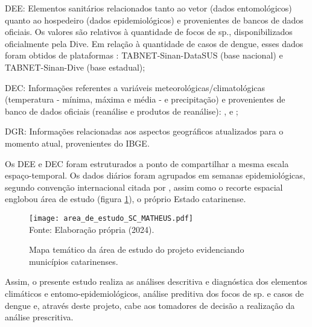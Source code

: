 \begin{alineas}

    \item \acrfull{DEE}: Elementos sanitários relacionados tanto ao vetor (dados entomológicos) quanto ao hospedeiro (dados epidemiológicos) e provenientes de bancos de dados oficiais. Os valores são relativos à quantidade de focos de  sp., disponibilizados oficialmente pela \acrshort{Dive}. Em relação à quantidade de casos de dengue, esses dados foram obtidos de plataformas : TABNET-\acrshort{Sinan}-\acrshort{DataSUS} (base nacional) e TABNET-\acrshort{Sinan}-\acrshort{Dive} (base estadual);
    
    \item \acrfull{DEC}: Informações referentes a variáveis meteorológicas/climatológicas (temperatura - mínima, máxima e média - e precipitação) e provenientes de banco de dados oficiais (reanálise e produtos de reanálise):  ,  e ;

    \item \acrfull{DGR}: Informações relacionadas aos aspectos geográficos atualizados para o momento atual, provenientes do \acrshort{IBGE}. 
    
\end{alineas}

\indent Os \acrshort{DEE} e \acrshort{DEC} foram estruturados a ponto de compartilhar a mesma escala espaço-temporal. Os dados diários foram agrupados em semanas epidemiológicas, segundo convenção internacional citada por , assim como o recorte espacial englobou área de estudo (figura \ref{fig:area_de_estudo}), o próprio Estado catarinense.

\begin{figure}[htbp]
    \centering
    \caption{Mapa temático da área de estudo do projeto evidenciando municípios catarinenses.}
    \texttt{[image: area\_de\_estudo\_SC\_MATHEUS.pdf]}
    \label{fig:area_de_estudo}
    \\
    \vspace{-0.05cm}\hspace{-7.5cm}\small{Fonte: Elaboração própria (2024).} 
\end{figure}

\indent Assim, o presente estudo realiza as análises descritiva e diagnóstica dos elementos climáticos e entomo-epidemiológicos,  análise preditiva dos focos de  sp. e casos de dengue e, através deste projeto, cabe aos tomadores de decisão a realização da análise prescritiva.

